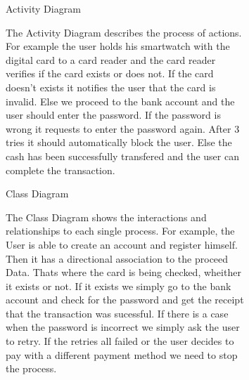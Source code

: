\documentclass{article}
\begin{document}
		\begin{figure}[htbp]
			\centering
			\begin{subfigure}{\textwidth}
				\resizebox{\textwidth}{!}{}
				\caption{Activity Diagram}
			\end{subfigure}
			\begin{subfigure}{\textwidth}
				The Activity Diagram describes the process of actions. For example the user holds his smartwatch with the digital card
				to a card reader and the card reader verifies if the card exists or does not. If the card doesn't exists it notifies
				the user that the card is invalid. Else we proceed to the bank account and the user should enter the password. If the 
				password is wrong it requests to enter the password again. After 3 tries it should automatically block the user. Else the 
				cash has been successfully transfered and the user can complete the transaction. 
			\end{subfigure}
		\end{figure}
		\newpage

		\begin{figure}[htbp]
			\centering
			\begin{subfigure}{\textwidth}
				\resizebox{\textwidth}{!}{}
				\caption{Class Diagram}
			\end{subfigure}
			\begin{subfigure}{\textwidth}
				The Class Diagram shows the interactions and relationships to each single process. For example, the User is
				able to create an account and register himself. Then it has a directional association to the proceed Data. Thats
				where the card is being checked, wheither it exists or not. If it exists we simply go to the bank account and check 
				for the password and get the receipt that the transaction was sucessful. If there is a case when the password is 
				incorrect we simply ask the user to retry. If the retries all failed or the user decides to pay with a different 
				payment method we need to stop the process. 
			\end{subfigure}
		\end{figure}
		\newpage
\end{document}
